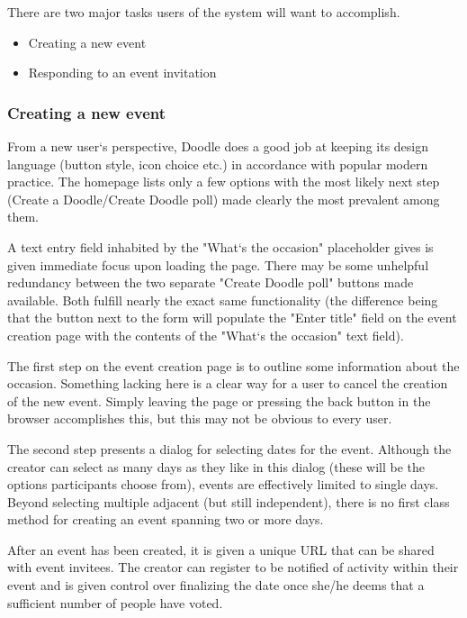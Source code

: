 \documentclass{sigchi}
\begin{document}
There are two major tasks users of the system will want
to accomplish.

\begin{itemize}
\item Creating a new event
\item Responding to an event invitation
\end{itemize}

\subsubsection{Creating a new event}

From a new user`s perspective, Doodle does a good job at keeping its
design language (button style, icon choice etc.) in accordance with
popular modern practice. The homepage lists only a few options with
the most likely next step (Create a Doodle/Create Doodle poll) made
clearly the most prevalent among them.

A text entry field inhabited by the "What`s the occasion"
placeholder gives is given immediate focus upon loading the
page. There may be some unhelpful redundancy between the two
separate "Create Doodle poll" buttons made available. Both fulfill
nearly the exact same functionality (the difference being that the
button next to the form will populate the "Enter title" field on the
event creation page with the contents of the "What`s the occasion"
text field).

The first step on the event creation page is to outline some
information about the occasion. Something lacking here is a clear
way for a user to cancel the creation of the new event. Simply
leaving the page or pressing the back button in the browser
accomplishes this, but this may not be obvious to every user.

The second step presents a dialog for selecting dates for the
event. Although the creator can select as many days as they like in
this dialog (these will be the options participants choose from),
events are effectively limited to single days. Beyond selecting
multiple adjacent (but still independent), there is no first class
method for creating an event spanning two or more days. 

After an event has been created, it is given a unique URL that can
be shared with event invitees. The creator can register to be
notified of activity within their event and is given control over
finalizing the date once she/he deems that a sufficient number of
people have voted.
\end{document}
